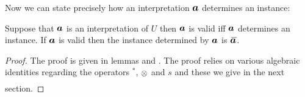 Now we can state precisely how an interpretation $\iI$ determines an instance: 


\begin{proposition}
Suppose that $\iI$ is an interpretation of $U$  then $\iI$ is valid  iff $\iI$ determines an instance. 
If $\iI$ is valid then the instance determined by $\iI$ is $\Ibar$.
\end{proposition}
\begin{proof}
The proof is given in lemmas  and .
The proof relies on various algebraic identities regarding the operators $^*$, $\underset{}{\otimes}$ and $s$ and these we give in the next section.
\end{proof}



